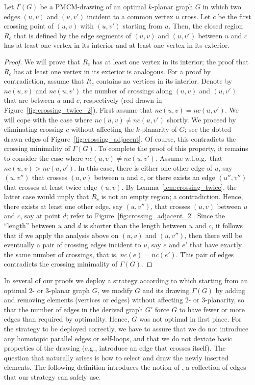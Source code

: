 \begin{lemma}
Let $\Gamma(G)$ be a PMCM-drawing of an optimal $k$-planar graph $G$ in which two edges $(u,v)$ and $(u,v')$ incident to a common vertex $u$ cross. Let $c$ be the first crossing point of $(u,v)$ with $(u,v')$ starting from $u$. Then, the closed region $R_{c}$ that is defined by the edge segments of $(u,v)$ and $(u,v')$ between $u$ and $c$ has at least one vertex in its interior and at least one vertex in its exterior. 
\label{lem:crossing_adjacent}
\end{lemma}
\begin{proof}
We will prove that $R_{c}$ has at least one vertex in its interior; the proof that $R_{c}$ has at least one vertex in its exterior is
analogous. For a proof by contradiction, assume that $R_{c}$ contains no vertices in its interior. Denote by $nc(u,v)$ and $nc(u,v')$ the number of crossings along $(u,v)$ and $(u,v')$ that are between $u$ and $c$, respectively (red drawn in Figure~\ref{fig:crossing_twice_2}). First assume that $nc(u,v) = nc(u,v')$. We will cope with the case where $nc(u,v) \neq nc(u,v')$ shortly. We proceed by eliminating crossing $c$ without affecting the $k$-planarity of $G$; see the dotted-drawn edges of Figure~\ref{fig:crossing_adjacent}. Of course, this contradicts the crossing minimality of $\Gamma(G)$. To complete the proof of this property, it remains to consider the case where $nc(u,v) \neq nc(u,v')$. Assume w.l.o.g.~that $nc(u,v) > nc(u,v')$. In this case, there is either one other edge of $u$, say $(u,v'')$ that crosses $(u,v)$ between $u$ and $c$, or there exists an edge $(u'',v'')$ that crosses at least twice edge $(u,v)$. By Lemma~\ref{lem:crossing_twice}, the latter case would imply that $R_{c}$ is not an empty region; a contradiction.  Hence, there exists at least one other edge, say $(u,v'')$, that crosses $(u,v)$ between $u$ and $c$, say at point $d$; refer to Figure~\ref{fig:crossing_adjacent_2}. Since the ``length'' between $u$ and $d$ is shorter than the length between $u$ and $c$, it follows that if we apply the analysis above on $(u,v)$ and $(u,v'')$, then there will be eventually a pair of crossing edges incident to $u$, say $e$ and $e'$ that have exactly the same number of crossings, that is, $nc(e) = nc(e')$. This pair of edges contradicts the crossing minimality of $\Gamma(G)$.   
\end{proof}

In several of our proofs we deploy a strategy according to which starting from an optimal $2$- or $3$-planar graph $G$, we modify $G$ and its drawing $\Gamma(G)$ by adding and removing elements (vertices or edges) without affecting $2$- or $3$-planarity, so that the number of edges in the derived graph $G'$ force $G$ to have fewer or more edges than required by optimality. Hence, $G$ was not optimal in first place. For the strategy to be deployed correctly, we have to assure that we do not introduce any homotopic parallel edges or self-loops, and that we do not deviate basic properties of the drawing (e.g., introduce an edge that crosses itself). The question that naturally arises is how to select and draw the newly inserted elements. The following definition introduces the notion of \pes, a collection of edges that our strategy can safely use.

